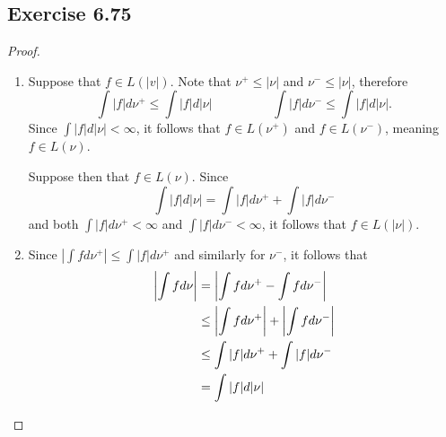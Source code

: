 \documentclass[hw_all.tex]{subfiles}
\begin{document}
\subsection{Exercise 6.75}
\begin{proof}
    \begin{enumerate}
        \item 
            Suppose that $f \in L(|v|)$. Note that $\nu^+ \leq |\nu|$ and $\nu^- \leq |\nu|$, therefore
            \[
                \int |f| d \nu^+ \leq \int |f| d |\nu| \hspace{2cm} \int |f| d \nu^- \leq \int |f| d |\nu|
            .\]
            Since $\int |f| d|\nu| < \infty$, it follows that $f \in L(\nu^+)$ and $f \in L(\nu^-)$, meaning $f \in L(\nu)$. 

            Suppose then that $f \in L(\nu)$. Since
            \[
                \int |f| d|\nu| = \int |f| d \nu^+ + \int |f| d \nu^-
            \]
            and both $\int |f| d \nu^+ < \infty$ and $\int |f| d \nu^- < \infty$, it follows that $f \in L(|\nu|)$.

        \item 
            Since $|\int f d \nu^+| \leq \int |f| d \nu^+$ and similarly for $\nu^-$, it follows that
            \begin{align*}
                \qty|\int f d \nu| &= \qty|\int f d \nu^+ - \int f d \nu^-|  \\
                                   &\leq \qty|\int f d \nu^+| + \qty|\int f d \nu^-| \\
                                   &\leq \int |f| d \nu^+ + \int |f| d \nu^- \\
                                   &= \int |f| d|\nu|
            \end{align*}


\end{enumerate}
\end{proof}
\end{document}

